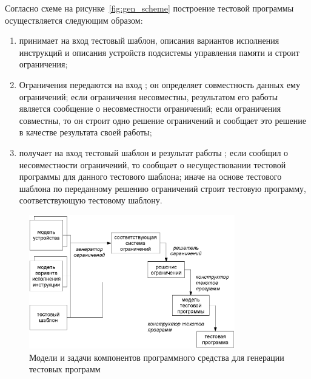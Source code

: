 Согласно схеме на рисунке~\ref{fig:gen_scheme} построение тестовой программы осуществляется следующим образом:
\begin{enumerate}
  \item {} принимает на вход тестовый шаблон, описания вариантов исполнения инструкций и описания устройств подсистемы управления памяти и строит ограничения;
  \item Ограничения передаются на вход ; он определяет совместность данных ему ограничений; если ограничения несовместны, результатом его работы является сообщение о несовместности ограничений; если ограничения совместны, то он строит одно решение ограничений и сообщает это решение в качестве результата своей работы;
  \item {} получает на вход тестовый шаблон и результат работы ; если  сообщил о несовместности ограничений, то  сообщает о несуществовании тестовой программы для данного тестового шаблона; иначе  на основе тестового шаблона по переданному  решению ограничений строит тестовую программу, соответствующую тестовому шаблону.
\end{enumerate}

\begin{figure}[h] \center
  \includegraphics[width=0.8\textwidth]{2.theor/scheme2}
  \caption{Модели и задачи компонентов программного средства для генерации тестовых программ}\label{fig:models_tasks}
\end{figure}

